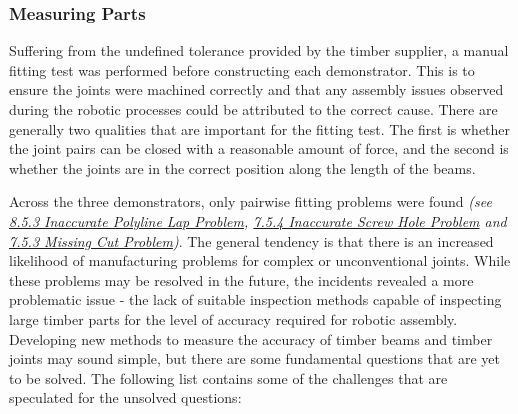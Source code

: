 \subsubsection{Measuring Parts}

Suffering from the undefined tolerance provided by the timber supplier, a manual fitting test was performed before constructing each demonstrator. This is to ensure the joints were machined correctly and that any assembly issues observed during the robotic processes could be attributed to the correct cause. There are generally two qualities that are important for the fitting test. The first is whether the joint pairs can be closed with a reasonable amount of force, and the second is whether the joints are in the correct position along the length of the beams.

Across the three demonstrators, only pairwise fitting problems were found \textit{(see \ul{8.5.3 Inaccurate Polyline Lap Problem}, \ul{7.5.4 Inaccurate Screw Hole Problem} and \ul{7.5.3 Missing Cut Problem})}. The general tendency is that there is an increased likelihood of manufacturing problems for complex or unconventional joints. While these problems may be resolved in the future, the incidents revealed a more problematic issue - the lack of suitable inspection methods capable of inspecting large timber parts for the level of accuracy required for robotic assembly. Developing new methods to measure the accuracy of timber beams and timber joints may sound simple, but there are some fundamental questions that are yet to be solved. The following list contains some of the challenges that are speculated for the unsolved questions: 

